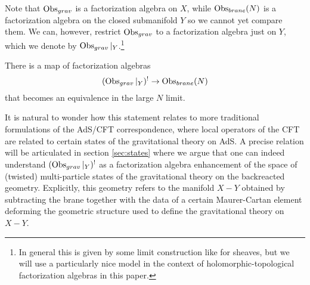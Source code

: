 Note that $\operatorname{Obs}_{grav}$ is a factorization algebra on $X$, while $\operatorname{Obs}_{brane}(N)$ is a factorization algebra on the closed submanifold $Y$ so we cannot yet compare them.
We can, however, restrict $\operatorname{Obs}_{grav}$ to a factorization algebra just on $Y$, which we denote by $\operatorname{Obs}_{grav}|_Y$.\footnote{In general this is given by some limit construction like for sheaves, but we will use a particularly nice model in the context of holomorphic-topological factorization algebras in this paper.}

\begin{expect}
There is a map of factorization algebras
\[
  (\operatorname{Obs}_{grav}|_{Y})^{!}\to \operatorname{Obs}_{brane}(N)
\]
that becomes an equivalence in the large $N$ limit.
\end{expect}

It is natural to wonder how this statement relates to more traditional formulations of the AdS/CFT correspondence, where local operators of the CFT are related to certain states of the gravitational theory on AdS. A precise relation will be articulated in section \ref{sec:states} where we argue that one can indeed understand $(\operatorname{Obs}_{grav}|_{Y})^{!}$ as a factorization algebra enhancement of the space of (twisted) multi-particle states of the gravitational theory on the backreacted geometry. Explicitly, this geometry refers to the manifold $X - Y$ obtained by subtracting the brane together with the data of a certain Maurer-Cartan element deforming the geometric structure used to define the gravitational theory on $X - Y$.

